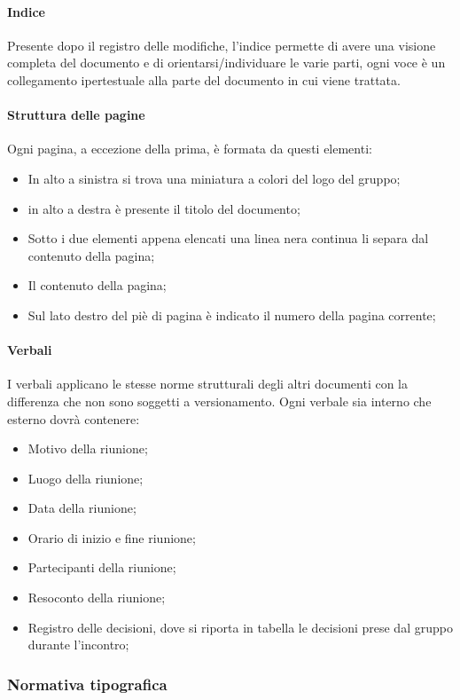 \paragraph{Indice}
Presente dopo il registro delle modifiche, l’indice permette di avere una visione completa del documento e di orientarsi/individuare le varie parti, ogni voce è un collegamento ipertestuale alla parte del documento in cui viene trattata.

\paragraph{Struttura delle pagine}
Ogni pagina, a eccezione della prima, è formata da questi elementi:
  \begin{itemize}
  		\item In alto a sinistra si trova una miniatura a colori del logo del gruppo;
  		\item in alto a destra è presente il titolo del documento;
  		\item Sotto i due elementi appena elencati una linea nera continua li separa dal contenuto della pagina;
  		\item Il contenuto della pagina;
  		\item Sul lato destro del piè di pagina è indicato il numero della pagina corrente;
	\end{itemize}
	
\paragraph{Verbali}
I verbali applicano le stesse norme strutturali degli altri documenti con la differenza che non sono soggetti a versionamento. Ogni verbale sia interno che esterno dovrà contenere:
\begin{itemize}
\item Motivo della riunione;
\item Luogo della riunione;
\item Data della riunione;
\item Orario di inizio e fine riunione;
\item Partecipanti della riunione;
\item Resoconto della riunione;
\item Registro delle decisioni, dove si riporta in tabella le decisioni prese dal gruppo durante l’incontro;
\end{itemize}  		

\subsubsection{Normativa tipografica}
